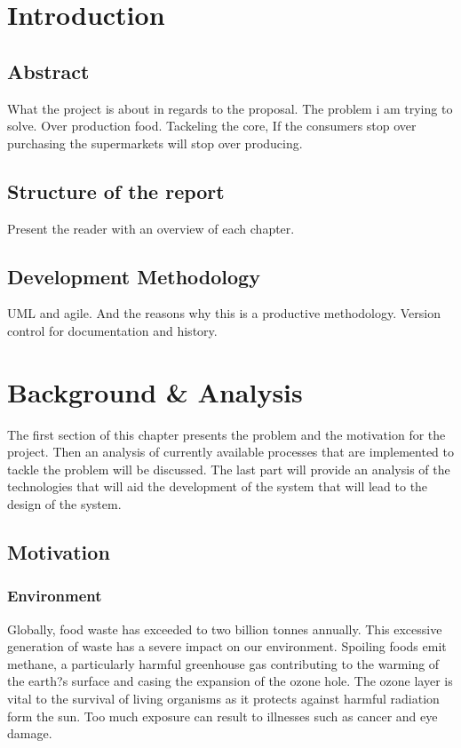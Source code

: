 \documentclass[a4paper, 11pt]{article}
\begin{document}
\setcounter{page}{1}
\section{Introduction}

\subsection{Abstract}
What the project is about in regards to the proposal. The problem i am trying to solve. Over production food.
Tackeling the core, If the consumers stop over purchasing the supermarkets will stop over producing. 


\subsection{Structure of the report}
Present the reader with an overview of each chapter.

\subsection{Development Methodology}
UML and agile. And the reasons why this is a productive methodology.
Version control for documentation and history. 
\clearpage

\section{Background \& Analysis}
The first section of this chapter presents the problem and the motivation for the project. Then an analysis of currently available processes that are implemented to tackle the problem will be discussed. The last part will provide an analysis of the technologies that will aid the development of the system that will lead to the design of the system. 

\subsection{Motivation}

\subsubsection{Environment}
Globally, food waste has exceeded to two billion tonnes annually. This excessive generation of waste has a severe impact on our environment. Spoiling foods emit methane, a particularly harmful greenhouse gas contributing to the warming of the earth?s surface and casing the expansion of the ozone hole. The ozone layer is vital to the survival of living organisms as it protects against harmful radiation form the sun. Too much exposure can result to illnesses such as cancer and eye damage. 
\end{document}
